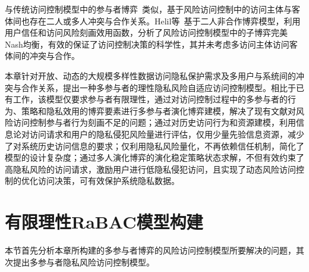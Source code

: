 与传统访问控制模型中的参与者博弈~\cite{gao2018game,hu2014game,liu2016dynamic}类似，基于风险访问控制中的访问主体与客体间也存在二人或多人冲突与合作关系。Helil等~\cite{helil2017non}基于二人非合作博弈模型，利用用户信任和访问风险刻画效用函数，分析了风险访问控制模型中的子博弈完美Nash均衡，有效的保证了访问控制决策的科学性，其并未考虑多访问主体访问客体间的冲突与合作。

本章针对开放、动态的大规模多样性数据访问隐私保护需求及多用户与系统间的冲突与合作关系，提出一种多参与者的理性隐私风险自适应访问控制模型。相比于已有工作，该模型仅要求参与者有限理性，通过对访问控制过程中的多参与者的行为、策略和隐私效用的博弈要素进行多参与者演化博弈建模，解决了现有文献对风险访问控制参与者行为刻画不足的问题；通过对历史访问行为和资源建模，利用信息论对访问请求和用户的隐私侵犯风险量进行评估，仅用少量先验信息资源，减少了对系统历史访问信息的要求；仅利用隐私风险量化，不再依赖信任机制，简化了模型的设计复杂度；通过多人演化博弈的演化稳定策略状态求解，不但有效约束了高隐私风险的访问请求，激励用户进行低隐私侵犯访问，且实现了动态风险访问控制的优化访问决策，可有效保护系统隐私数据。

\section{有限理性RaBAC模型构建}
本节首先分析本章所构建的多参与者博弈的风险访问控制模型所要解决的问题，其次提出多参与者隐私风险访问控制模型。

